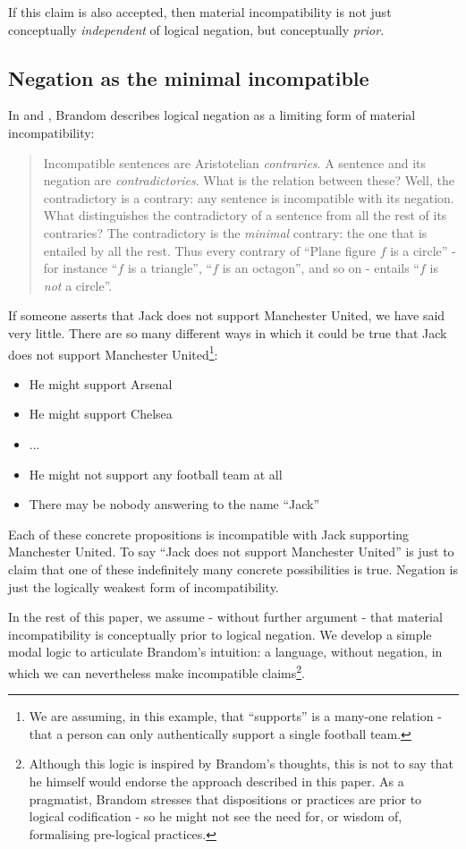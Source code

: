 \NI If this claim is also accepted, then material incompatibility is
not just conceptually \emph{independent} of logical negation, but
conceptually \emph{prior}.  

\subsection{Negation as the minimal incompatible}

In \cite{brandom2} and \cite{brandom}, Brandom describes 
logical negation as a limiting form of material incompatibility:
\begin{quote}
Incompatible sentences are Aristotelian \emph{contraries}. A sentence
and its negation are \emph{contradictories}. What is the relation
between these? Well, the contradictory is a contrary: any sentence is
incompatible with its negation. What distinguishes the contradictory
of a sentence from all the rest of its contraries? The contradictory
is the \emph{minimal} contrary: the one that is entailed by all the
rest. Thus every contrary of ``Plane figure $f$ is a circle'' - for
instance ``$f$ is a triangle'', ``$f$ is an octagon'', and so on -
entails ``$f$ is \emph{not} a circle''.
\end{quote}

\NI If someone asserts that Jack does not support Manchester United,
we have said very little.  There are so many different ways in which
it could be true that Jack does not support Manchester
United\footnote{We are assuming, in this example, that ``supports'' is
  a many-one relation - that a person can only authentically support a
  single football team.}:
\begin{itemize}
\item
He might support Arsenal
\item
He might support Chelsea
\item
...
\item
He might not support any football team at all
\item
There may be nobody answering to the name ``Jack''
\end{itemize}
Each of these concrete propositions is incompatible with Jack supporting Manchester United.
To say ``Jack does not support Manchester United'' is just to claim that one of these indefinitely many concrete possibilities is true.
Negation is just the logically weakest form of incompatibility.

In the rest of this paper, we assume - without further argument - that material incompatibility is conceptually prior to logical negation.
We develop a simple
 modal logic to articulate Brandom's intuition: a language, without negation, in which we can nevertheless make incompatible claims\footnote{Although this logic is inspired by Brandom's thoughts, this is not to say that he himself would endorse the approach described in this paper. As a pragmatist, Brandom stresses that dispositions or practices are prior to logical codification - so he might not see the need for, or wisdom of, formalising pre-logical practices.}.

